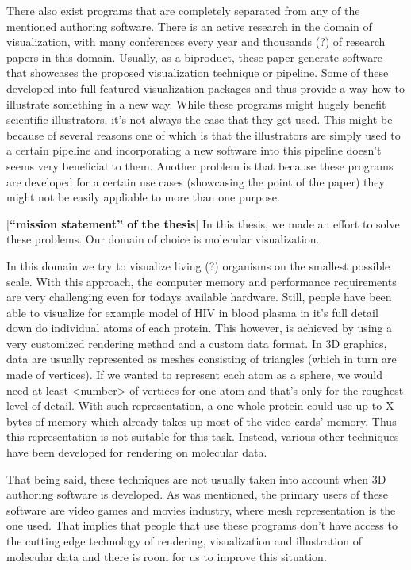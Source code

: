 \documentclass[
  digital, %
  table,   %
  nolof,     %
  nolot,     %
]{fithesis3}
\begin{document}
There also exist programs that are completely separated from any of the mentioned authoring software. There is an active research in the domain of visualization, with many conferences every year and thousands (?) of research papers in this domain. Usually, as a biproduct, these paper generate software that showcases the proposed visualization technique or pipeline. Some of these developed into full featured visualization packages and thus provide a way how to illustrate something in a new way. While these programs might hugely benefit scientific illustrators, it's not always the case that they get used. This might be because of several reasons one of which is that the illustrators are simply used to a certain pipeline and incorporating a new software into this pipeline doesn't seems very beneficial to them. Another problem is that because these programs are developed for a certain use cases (showcasing the point of the paper) they might not be easily appliable to more than one purpose.

[\textbf{``mission statement'' of the thesis}]
In this thesis, we made an effort to solve these problems. Our domain of choice is molecular visualization.

In this domain we try to visualize living (?) organisms on the smallest possible scale. With this approach, the computer memory and performance requirements are very challenging even for todays available hardware. Still, people have been able to visualize for example model of HIV in blood plasma in it's full detail down do individual atoms of each protein. This however, is achieved by using a very customized rendering method and a custom data format. In 3D graphics, data are usually represented as meshes consisting of triangles (which in turn are made of vertices). If we wanted to represent each atom as a sphere, we would need at least <number> of vertices for one atom and that's only for the roughest level-of-detail. With such representation, a one whole protein could use up to X bytes of memory which already takes up most of the video cards' memory. Thus this representation is not suitable for this task. Instead, various other techniques have been developed for rendering on molecular data.

That being said, these techniques are not usually taken into account when 3D authoring software is developed. As was mentioned, the primary users of these software are video games and movies industry, where mesh representation is the one used. That implies that people that use these programs don't have access to the cutting edge technology of rendering, visualization and illustration of molecular data and there is room for us to improve this situation.
\end{document}
